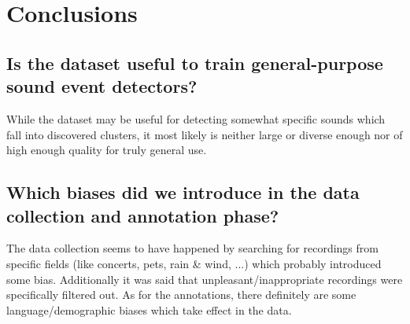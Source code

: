 
\section{Conclusions}
\label{sec:Conclusions}


\subsection{Is the dataset useful to train general-purpose sound event detectors?}
\label{sec:Conclusions:a}

While the dataset may be useful for detecting somewhat specific sounds which fall into discovered clusters, it most likely is neither large or diverse enough nor of high enough quality for truly general use.

\subsection{Which biases did we introduce in the data collection and annotation phase?}
\label{sec:Conclusions:c}
The data collection seems to have happened by searching for recordings from specific fields (like concerts, pets, rain \& wind, ...) which probably introduced some bias. Additionally it was said that unpleasant/inappropriate recordings were specifically filtered out. As for the annotations, there definitely are some language/demographic biases which take effect in the data.

